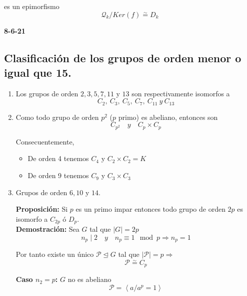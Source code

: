 \documentclass{article}
\begin{document}
es un epimorfismo
\begin{equation*}
\mathcal{Q}_k/Ker(f)\overset{\sim}{=} D_k
\end{equation*}

\textbf{8-6-21} 

\subsection{Clasificación de los grupos de orden menor o igual que 15.}

\begin{enumerate}[(1)]
\item Los grupos de orden $2,3,5,7,11$ y $13$ son respectivamente isomorfos a
\begin{equation*}
C_2,\:C_3,\:C_5,\:C_7,\:C_{11}\:y\:C_{13}
\end{equation*}

\item Como todo grupo de orden $p^2$ ($p$ primo) es abeliano, entonces son
\begin{equation*}
C_{p^2}\quad y \quad C_p\times C_p
\end{equation*}

Consecuentemente,
	\begin{itemize}
	\item De orden 4 tenemos $C_4$ y $C_2\times C_2=K$
	
	\item De orden 9 tenemos $C_9$ y $C_3\times C_3$
	\end{itemize}
	
\item Grupos de orden $6,10$ y $14$.

\textbf{Proposición:} Si $p$ es un primo impar entonces todo grupo de orden $2p$ es isomorfo a $C_{2p}$ ó $D_p$. \\

\textbf{Demostración:} Sea $G$ tal que $|G|=2p$
\begin{equation*}
n_p\mid 2\quad y\quad n_p\equiv 1\mod{p}\Rightarrow n_p=1
\end{equation*}

Por tanto existe un único $\mathcal{P}\unlhd G$ tal que $|\mathcal{P}|=p\Rightarrow$
\begin{equation*}
\mathcal{P}\overset{\sim}{=}C_p
\end{equation*}

\textbf{Caso $n_2=p$:} $G$ no es abeliano
\begin{equation*}
\mathcal{P}=\left\langle a/a^p=1\right\rangle
\end{equation*}


\end{enumerate}
\end{document}
